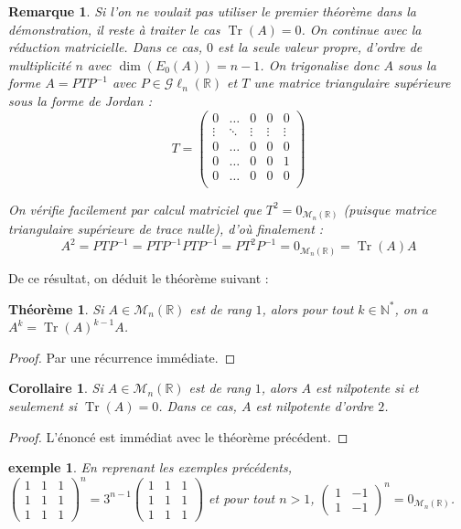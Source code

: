 \documentclass[a4paper]{article}
\newtheorem*{theorem}{Théorème}
\newtheorem*{remark}{Remarque}
\newtheorem*{example}{exemple}
\newtheorem*{cor}{Corollaire}
\begin{document}
\begin{remark}
    Si l'on ne voulait pas utiliser le premier théorème dans la démonstration, il reste à traiter le cas $\operatorname{Tr}(A) = 0$. On continue avec la réduction matricielle. Dans ce cas, $0$ est la seule valeur propre, d'ordre de multiplicité $n$ avec $\dim(E_0(A))=n-1$. On trigonalise donc $A$ sous la forme $A = PTP^{-1}$ avec $P \in \mathcal{G}\ell_n(\mathbb{R})$ et $T$ une matrice triangulaire supérieure sous la forme de Jordan :
    $$ T = \begin{pmatrix}
        0 & \dots & 0 & 0 & 0 \\
        \vdots  & \ddots & \vdots & \vdots & \vdots \\
        0 & \dots & 0 & 0 & 0 \\
        0 & \dots & 0 & 0 & 1 \\
        0 & \dots & 0 & 0 & 0 \\
    \end{pmatrix}$$
    
    On vérifie facilement par calcul matriciel que $T^2 = 0_{\mathcal{M}_{n}(\mathbb{R})}$ (puisque matrice triangulaire supérieure de trace nulle), d'où finalement : $$A^2 = PTP^{-1} = PTP^{-1}PTP^{-1} = PT^2P^{-1} = 0_{\mathcal{M}_{n}(\mathbb{R})} = \operatorname{Tr}(A)A$$
\end{remark}

De ce résultat, on déduit le théorème suivant :

\begin{theorem}
    Si $A \in \mathcal{M}_{n}(\mathbb{R})$ est de rang $1$, alors pour tout $k \in \mathbb{N}^*$, on a $A^k = \operatorname{Tr}(A)^{k-1}A$.
\end{theorem}

\begin{proof}
    Par une récurrence immédiate.
\end{proof}

\begin{cor}
    Si $A \in \mathcal{M}_{n}(\mathbb{R})$ est de rang $1$, alors $A$ est nilpotente si et seulement si $\operatorname{Tr}(A) = 0$. Dans ce cas, $A$ est nilpotente d'ordre $2$.
\end{cor}

\begin{proof}
    L'énoncé est immédiat avec le théorème précédent.
\end{proof}

\begin{example}
    En reprenant les exemples précédents, $\begin{pmatrix} 1 & 1 & 1 \\ 1 & 1 & 1 \\ 1 & 1 & 1 \end{pmatrix} ^n = 3^{n-1} \begin{pmatrix} 1 & 1 & 1 \\ 1 & 1 & 1 \\ 1 & 1 & 1 \end{pmatrix}$ et pour tout $n > 1$, $\begin{pmatrix}1 & -1 \\ 1 & -1\end{pmatrix}^n = 0_{\mathcal{M}_{n}(\mathbb{R})}$.
\end{example}
\end{document}
